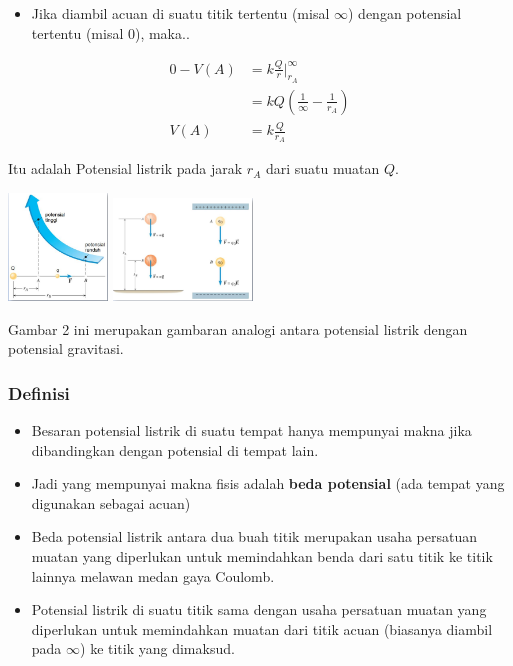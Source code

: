 \documentclass[twocolumn, 11pt]{article}%
\begin{document}
     \begin{itemize}
         \item Jika diambil acuan di suatu titik tertentu (misal $\infty$) dengan potensial tertentu (misal 0), maka..
     \end{itemize}

     \begin{align*}
         0-V(A)&=k\frac{Q}{r} \bigg|_{r_A}^{\infty}\\
               &= kQ\left( \frac1{\infty}-\frac1{r_A} \right)\\
         V(A) &= k\frac{Q}{r_A}
     \end{align*}

     Itu adalah Potensial listrik pada jarak $r_A$ dari suatu muatan $Q$.
     \begin{center}
         \includegraphics[width=100px]{2.png}
         \includegraphics[width=140px]{3.png}
     \end{center}

     Gambar 2 ini merupakan gambaran analogi antara potensial listrik dengan potensial gravitasi.

     \subsubsection{Definisi}%
     \begin{itemize}
         \item Besaran potensial listrik di suatu tempat hanya mempunyai makna jika dibandingkan dengan potensial di tempat lain.
         \item Jadi yang mempunyai makna fisis adalah \textbf{beda potensial} (ada tempat yang digunakan sebagai acuan)
         \item Beda potensial listrik antara dua buah titik merupakan usaha persatuan muatan yang diperlukan untuk memindahkan benda dari satu titik ke titik lainnya melawan medan gaya Coulomb.
         \item Potensial listrik di suatu titik sama dengan usaha persatuan muatan yang diperlukan untuk memindahkan muatan dari titik acuan (biasanya diambil pada $\infty$) ke titik yang dimaksud.
     \end{itemize}
\end{document}
